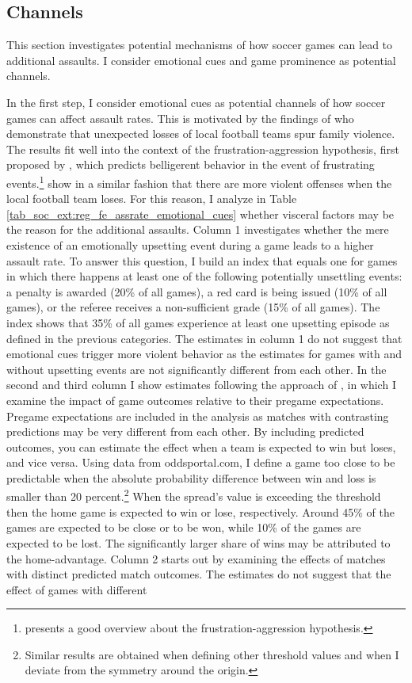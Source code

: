 \documentclass[11pt, a4paper]{article} %
\begin{document}
\subsection{Channels}
This section investigates potential mechanisms of how soccer games can lead to additional assaults. I consider emotional cues and game prominence as potential channels.


In the first step, I consider emotional cues as potential channels of how soccer games can affect assault rates. This is motivated by the findings of \cite{card2011family} who demonstrate that unexpected losses of local football teams spur family violence. The results fit well into the context of the frustration-aggression hypothesis, first proposed by \cite{dollard1939frustration}, which predicts belligerent behavior in the event of frustrating events.\footnote{\cite{berkowitz1989frustration} presents a good overview about the frustration-aggression hypothesis.} \cite{rees2009college} show in a similar fashion that there are more violent offenses when the local football team loses. For this reason, I analyze in Table \ref{tab_soc_ext:reg_fe_assrate_emotional_cues} whether visceral factors may be the reason for the additional assaults. Column 1 investigates whether the mere existence of an emotionally upsetting event during a game leads to a higher assault rate. To answer this question, I build an index that equals one for games in which there happens at least one of the following potentially unsettling events: a penalty is awarded (20\% of all games), a red card is being issued (10\% of all games), or the referee receives a non-sufficient grade (15\% of all games). The index shows that 35\% of all games experience at least one upsetting episode as defined in the previous categories. The estimates in column 1 do not suggest that emotional cues trigger more violent behavior as the estimates for games with and without upsetting events are not significantly different from each other. 	In the second and third column I show estimates following the approach of \cite{card2011family}, in which I examine the impact of game outcomes relative to their pregame expectations. Pregame expectations are included in the analysis as matches with contrasting predictions may be very different from each other. By including predicted outcomes, you can estimate the effect when a team is expected to win but loses, and vice versa. Using data from oddsportal.com, I define a game too close to be predictable when the absolute probability difference between win and loss is smaller than 20 percent.\footnote{Similar results are obtained when defining other threshold values and when I deviate from the symmetry around the origin.} When the spread's value is exceeding the threshold then the home game is expected to win or lose, respectively. Around 45\% of the games are expected to be close or to be won, while 10\% of the games are expected to be lost. The significantly larger share of wins may be attributed to the home-advantage. Column 2 starts out by examining the effects of matches with distinct predicted match outcomes. The estimates do not suggest that the effect of games with different 
\end{document}
